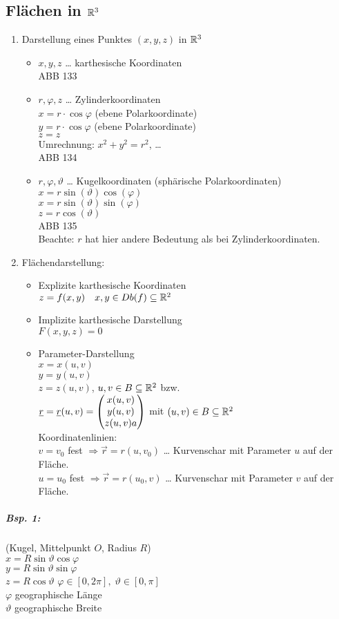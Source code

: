 \subsection{Flächen in \texorpdfstring{$\mathbb{R}^3$}{}}
\begin{enumerate}
\item Darstellung eines Punktes $(x,y,z)$ in $\mathbb{R}^3$
\begin{itemize}
\item $x,y,z$ … karthesische Koordinaten\\
ABB 133
\item $r, \varphi, z$ … Zylinderkoordinaten\\
$x=r\cdot \cos \varphi$ (ebene Polarkoordinate)\\
$y= r \cdot \cos \varphi$ (ebene Polarkoordinate)\\
$z=z$\\
Umrechnung: $x^2+y^2=r^2$, …\\
ABB 134
\item $r, \varphi, \vartheta$ … Kugelkoordinaten (sphärische Polarkoordinaten)\\
$x=r\sin(\vartheta) \cos (\varphi)$\\
$x=r\sin(\vartheta) \sin(\varphi)$\\
$z=r\cos (\vartheta)$\\
ABB 135\\
Beachte: $r$ hat hier andere Bedeutung als bei Zylinderkoordinaten.
\end{itemize}
\item Flächendarstellung:
\begin{itemize}
\item Explizite karthesische Koordinaten\\
$z=f(x,y) \quad x,y \in Db(f) \subseteq \mathbb{R}^2$
\item Implizite karthesische Darstellung\\
$F(x,y,z) = 0$
\item Parameter-Darstellung\\
$x=x(u,v)$\\
$y=y(u,v)$\\
$z=z(u,v)$, \quad $u,v \in B\subseteq \mathbb{R}^2$ bzw.\\
$\underline{r}=\underline{r}(u,v) = \begin{pmatrix}x(u,v)\\ y(u,v)\\ z(u,v)a\end{pmatrix}$ \quad mit $(u,v) \in B \subseteq \mathbb{R}^2$\\
Koordinatenlinien: \\
$v=v_0$ fest $\Rightarrow \vec{r}=r(u,v_0)$ … Kurvenschar mit Parameter $u$ auf der Fläche.\\
$u=u_0$ fest $\Rightarrow \vec{r}=r(u_0, v)$ … Kurvenschar mit Parameter $v$ auf der Fläche.
\end{itemize}
\end{enumerate}
\subparagraph{Bsp. 1:} (Kugel, Mittelpunkt $O$, Radius $R$)\\
$x= R \sin \vartheta \cos \varphi$\\
$y=R \sin \vartheta \sin \varphi$\\
$z = R \cos \vartheta$ \qquad $\varphi \in [0,2\pi], \; \vartheta \in [0,\pi]$\\
$\varphi$ geographische Länge\\
$\vartheta$ geographische Breite
